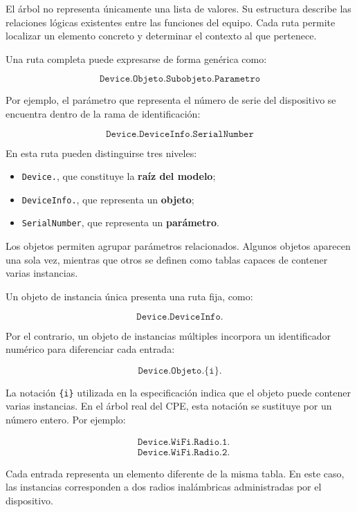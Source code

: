 El árbol no representa únicamente una lista de valores. Su estructura
describe las relaciones lógicas existentes entre las funciones del
equipo. Cada ruta permite localizar un elemento concreto y determinar el
contexto al que pertenece.

Una ruta completa puede expresarse de forma genérica como:

\[
    \texttt{Device.Objeto.Subobjeto.Parametro}
\]

Por ejemplo, el parámetro que representa el número de serie del
dispositivo se encuentra dentro de la rama de identificación:

\[
    \texttt{Device.DeviceInfo.SerialNumber}
\]

En esta ruta pueden distinguirse tres niveles:

\begin{itemize}
    \item \texttt{Device.}, que constituye la \textbf{raíz del modelo};
    \item \texttt{DeviceInfo.}, que representa un \textbf{objeto};
    \item \texttt{SerialNumber}, que representa un \textbf{parámetro}.
\end{itemize}

Los objetos permiten agrupar parámetros relacionados. Algunos objetos
aparecen una sola vez, mientras que otros se definen como tablas capaces
de contener varias instancias.

Un objeto de instancia única presenta una ruta fija, como:

\[
    \texttt{Device.DeviceInfo.}
\]

Por el contrario, un objeto de instancias múltiples incorpora un
identificador numérico para diferenciar cada entrada:

\[
    \texttt{Device.Objeto.\{i\}.}
\]

La notación \texttt{\{i\}} utilizada en la especificación indica que el
objeto puede contener varias instancias. En el árbol real del CPE, esta
notación se sustituye por un número entero. Por ejemplo:

\[
\begin{aligned}
    &\texttt{Device.WiFi.Radio.1.}\\
    &\texttt{Device.WiFi.Radio.2.}
\end{aligned}
\]

Cada entrada representa un elemento diferente de la misma tabla. En este
caso, las instancias corresponden a dos radios inalámbricas administradas
por el dispositivo.

